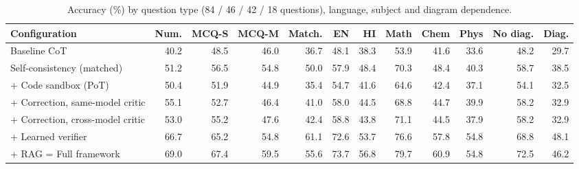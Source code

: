 \begin{table}[t]
\centering
\footnotesize
\caption{Accuracy (\%) by question type (84 / 46 / 42 / 18 questions), language, subject and diagram dependence.}
\label{tab:breakdown}
\setlength{\tabcolsep}{3.5pt}
\begin{tabular}{lrrrrrrrrrrr}
\toprule
Configuration & Num. & MCQ-S & MCQ-M & Match. & EN & HI & Math & Chem & Phys & No diag. & Diag. \\
\midrule
Baseline CoT & 40.2 & 48.5 & 46.0 & 36.7 & 48.1 & 38.3 & 53.9 & 41.6 & 33.6 & 48.2 & 29.7 \\
Self-consistency (matched) & 51.2 & 56.5 & 54.8 & 50.0 & 57.9 & 48.4 & 70.3 & 48.4 & 40.3 & 58.7 & 38.5 \\
+ Code sandbox (PoT) & 50.4 & 51.9 & 44.9 & 35.4 & 54.7 & 41.6 & 64.6 & 42.4 & 37.1 & 54.1 & 32.5 \\
+ Correction, same-model critic & 55.1 & 52.7 & 46.4 & 41.0 & 58.0 & 44.5 & 68.8 & 44.7 & 39.9 & 58.2 & 32.9 \\
+ Correction, cross-model critic & 53.0 & 55.2 & 47.6 & 42.4 & 58.8 & 43.8 & 71.1 & 44.5 & 37.9 & 58.2 & 32.9 \\
+ Learned verifier & 66.7 & 65.2 & 54.8 & 61.1 & 72.6 & 53.7 & 76.6 & 57.8 & 54.8 & 68.8 & 48.1 \\
+ RAG = Full framework & 69.0 & 67.4 & 59.5 & 55.6 & 73.7 & 56.8 & 79.7 & 60.9 & 54.8 & 72.5 & 46.2 \\
\bottomrule
\end{tabular}
\end{table}
